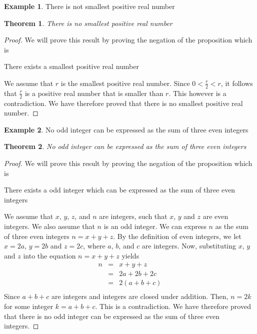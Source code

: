 \documentclass{book}
\newtheorem{theorem}{Theorem}[section]
\theoremstyle{definition}
\newtheorem{example}{Example}[definition]
\theoremstyle{remark}
\begin{document}
\newpage
\begin{example}
There is not smallest positive real number
\begin{tcolorbox}
	\begin{theorem}
	\label{the2}		
		There is no smallest positive real number
	\end{theorem}
\end{tcolorbox}

\begin{proof}

We will prove this result by proving the negation of the proposition which is
	\begin{center}
		There exists a smallest positive real number
	\end{center}

We assume that $r$ is the smallest positive real number. Since $0 < \frac{r}{2} < r$, it follows that $\frac{r}{2}$ is a positive real number that is smaller than $r$. This however is a contradiction. We have therefore proved that there is no smallest positive real number. 

\end{proof}
\end{example}

\newpage
\begin{example}
No odd integer can be expressed as the sum of three even integers
\begin{tcolorbox}
	\begin{theorem}
	\label{the2}		
		No odd integer can be expressed as the sum of three even integers
	\end{theorem}
\end{tcolorbox}

\begin{proof}
    We will prove this result by proving the negation of the proposition which is
    	\begin{center}
    		There exists a odd integer which can be expressed as the sum of three even integers
    	\end{center}
    
    We assume that $x$, $y$, $z$, and $n$ are integers, such that $x$, $y$ and $z$ are even integers. We also assume that $n$ is an odd integer. We can express $n$ as the sum of three even integers $n = x + y + z$. By the definition of even integers, we let $x=2a$, $y=2b$ and $z=2c$, where $a$, $b$, and $c$ are integers. Now, substituting $x$, $y$ and $z$ into the equation $n = x + y + z$ yields
    		\begin{eqnarray*}
    			n & = & x + y + z \nonumber \\
    			& = & 2a + 2b + 2c \nonumber \\
    			& = & 2(a + b + c) \nonumber \\
    		\end{eqnarray*}
    Since $a + b + c$ are integers and integers are closed under addition. Then, $n=2k$ for some integer $k = a + b + c$. This is a contradiction. We have therefore proved that there is no odd integer can be expressed as the sum of three even integers.
\end{proof}
\end{example}
\end{document}
